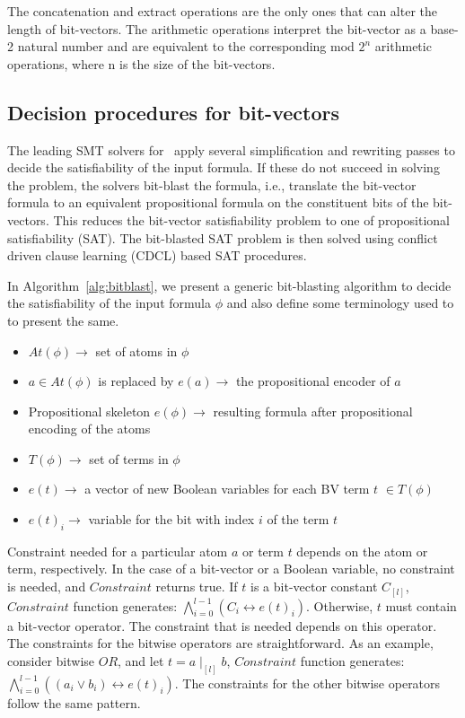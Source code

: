 The
concatenation and extract operations are the only ones that can alter the
length of bit-vectors. The arithmetic operations interpret the bit-vector as a base-2 natural number and are
equivalent to the corresponding mod $2^n$ arithmetic operations, where n is the size of the bit-vectors.

\subsection{Decision procedures for bit-vectors}

The leading SMT solvers for \qfbv~apply several simplification and
rewriting passes to decide the satisfiability of the input formula.
If these do not succeed in solving the problem, the solvers bit-blast
the formula, i.e., translate the bit-vector formula to an
equivalent propositional formula on the constituent bits of the
bit-vectors.  This reduces the bit-vector satisfiability problem to
one of propositional satisfiability (SAT).
%
The bit-blasted SAT problem is then solved using conflict driven clause
learning (CDCL)\cite{cdcl1,cdcl2} based SAT procedures.
%

In Algorithm~\ref{alg:bitblast}, we present a generic bit-blasting algorithm to decide the satisfiability of the input formula $\phi$ and also define some terminology used to to present the same.

\begin{itemize}

\item $At(\phi)\rightarrow$ set of atoms in $\phi$ 
\item $a \in At(\phi)$ is replaced by $e(a) \rightarrow$ the propositional encoder of $a$ 
\item Propositional skeleton $e(\phi) \rightarrow$ resulting formula after propositional encoding of the atoms 
\item $T(\phi)\rightarrow$ set of terms in $\phi$ 
\item $e(t)\rightarrow$ a vector of new Boolean variables for each BV term $t$ $\in T(\phi)$ 
\item $e(t)_i\rightarrow$ variable for the bit with index $i$ of the term $t$ 
\end{itemize}



Constraint needed for a particular atom $a$ or term $t$ depends
on the atom or term, respectively. In the case of a bit-vector or a Boolean
variable, no constraint is needed, and $Constraint$ returns true. If $t$ is
a bit-vector constant $C_{[l]}$, $Constraint$ function generates: $\bigwedge^{l-1}_{i=0}(C_i \leftrightarrow e(t)_i)$. Otherwise, $t$ must contain a bit-vector operator. The constraint that is needed
depends on this operator. The constraints for the bitwise operators are
straightforward. As an example, consider bitwise $OR$, and let $t = a \mid_{[l]} b$, $Constraint$ function generates: $\bigwedge^{l-1}_{i=0}((a_i \lor b_i) \leftrightarrow e(t)_i)$. The constraints for the other bitwise operators follow the same pattern.


